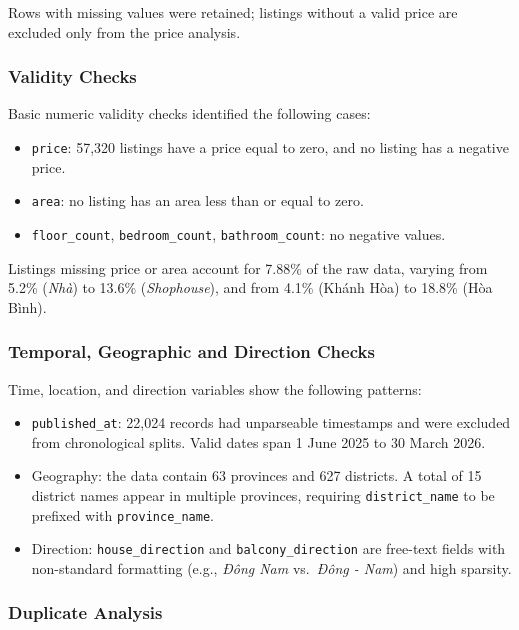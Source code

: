 Rows with missing values were retained; listings without a valid price are excluded only from the price analysis.

\subsubsection{Validity Checks}

Basic numeric validity checks identified the following cases:

\begin{itemize}
  \item \texttt{price}: 57,320 listings have a price equal to zero, and no listing has a negative price.
  \item \texttt{area}: no listing has an area less than or equal to zero.
  \item \texttt{floor\_count}, \texttt{bedroom\_count}, \texttt{bathroom\_count}: no negative values.
\end{itemize}

Listings missing price or area account for 7.88\% of the raw data, varying from 5.2\% (\textit{Nhà}) to 13.6\% (\textit{Shophouse}), and from 4.1\% (Khánh Hòa) to 18.8\% (Hòa Bình).

\subsubsection{Temporal, Geographic and Direction Checks}

Time, location, and direction variables show the following patterns:

\begin{itemize}
  \item \texttt{published\_at}: 22,024 records had unparseable timestamps and were excluded from chronological splits. Valid dates span 1 June 2025 to 30 March 2026.
  \item Geography: the data contain 63 provinces and 627 districts. A total of 15 district names appear in multiple provinces, requiring \texttt{district\_name} to be prefixed with \texttt{province\_name}.
  \item Direction: \texttt{house\_direction} and \texttt{balcony\_direction} are free-text fields with non-standard formatting (e.g., \textit{Đông Nam} vs.\ \textit{Đông - Nam}) and high sparsity.
\end{itemize}

\subsubsection{Duplicate Analysis}

